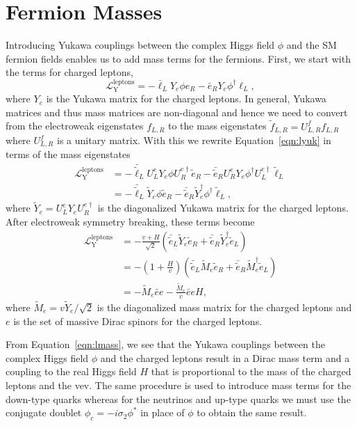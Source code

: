 \section{Fermion Masses}
\label{subsec:yukawa}

Introducing Yukawa couplings between the complex Higgs field $\phi$ and the SM fermion fields enables us to add mass terms for the fermions.
First, we start with the terms for charged leptons,
\begin{equation}
  \label{eqn:lyuk}
  \mathcal{L}^{\text{leptons}}_{\text{Y}} = - \bar \ell_L Y_e \phi e_R - \bar e_R Y_e \phi^\dagger \ell_L,
\end{equation}
where $Y_e$ is the Yukawa matrix for the charged leptons.
In general, Yukawa matrices and thus mass matrices are non-diagonal and hence we need to convert from the electroweak eigenstates $f_{L,R}$ to the mass eigenstates $\tilde{f}_{L,R} = U^{f}_{L,R} f_{L,R}$ where $U^{f}_{L,R}$ is a unitary matrix.
With this we rewrite Equation~\ref{eqn:lyuk} in terms of the mass eigenstates
\begin{align}
  \mathcal{L}^{\text{leptons}}_{\text{Y}} & = - \bar{\tilde{\ell}}_{L} U^e_L Y_e \phi U^{e\dagger}_R \tilde{e}_{R} - \bar{\tilde{e}}_{R} U^e_R Y_e \phi^\dagger U^{e\dagger}_L \tilde{\ell}_{L} \nonumber \\
  & = - \bar{\tilde{\ell}}_{L} \tilde Y_e \phi \tilde{e}_{R} - \bar{\tilde{e}}_{R} \tilde Y_e^\dagger \phi^\dagger \tilde{\ell}_{L}, 
\end{align}
where $\tilde Y_e = U^e_L Y_e U^{e\dagger}_R$ is the diagonalized Yukawa matrix for the charged leptons.
After electroweak symmetry breaking, these terms become
\begin{align}
  \mathcal{L}^{\text{leptons}}_{\text{Y}} & = - \frac{v + H}{\sqrt{2}} \left( \bar{\tilde{e}}_L \tilde Y_e  \tilde{e}_R + \bar{\tilde{e}}_R \tilde Y_e^\dagger \tilde{e}_L \right) \nonumber \\
  & = - \left(1 + \frac{H}{v}\right) \left( \bar{\tilde{e}}_L \tilde M_e \tilde{e}_R + \bar{\tilde{e}}_R \tilde M_e^\dagger \tilde{e}_L \right) \nonumber \\
  & = - \tilde M_e \bar e e - \frac{\tilde M_e}{v} \bar e e H,
    \label{eqn:lmass}
\end{align}
where $\tilde M_e = v \tilde Y_e / \sqrt{2}$ is the diagonalized mass matrix for the charged leptons and $e$ is the set of massive Dirac spinors for the charged leptons.

From Equation~\ref{eqn:lmass}, we see that the Yukawa couplings between the complex Higgs field $\phi$ and the charged leptons result in a Dirac mass term and a coupling to the real Higgs field $H$ that is proportional to the mass of the charged leptons and the vev.
The same procedure is used to introduce mass terms for the down-type quarks whereas for the neutrinos and up-type quarks we must use the conjugate doublet $\phi_c = - i \sigma_2 \phi^*$ in place of $\phi$ to obtain the same result.

